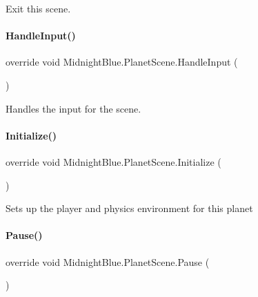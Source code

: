 Exit this scene. 

\hypertarget{class_midnight_blue_1_1_planet_scene_a6c84a639f27b9f7510b514969d47d1bd}{}\label{class_midnight_blue_1_1_planet_scene_a6c84a639f27b9f7510b514969d47d1bd} 
\paragraph{\texorpdfstring{Handle\+Input()}{HandleInput()}}
{\footnotesize\ttfamily override void Midnight\+Blue.\+Planet\+Scene.\+Handle\+Input (\begin{DoxyParamCaption}{ }\end{DoxyParamCaption})\hspace{0.3cm}{\ttfamily [inline]}}



Handles the input for the scene. 

\hypertarget{class_midnight_blue_1_1_planet_scene_ac8b7e88283b22b87aa45f116b549e86f}{}\label{class_midnight_blue_1_1_planet_scene_ac8b7e88283b22b87aa45f116b549e86f} 
\paragraph{\texorpdfstring{Initialize()}{Initialize()}}
{\footnotesize\ttfamily override void Midnight\+Blue.\+Planet\+Scene.\+Initialize (\begin{DoxyParamCaption}{ }\end{DoxyParamCaption})\hspace{0.3cm}{\ttfamily [inline]}}



Sets up the player and physics environment for this planet 

\hypertarget{class_midnight_blue_1_1_planet_scene_abc077e1cd5f40879ca3af4224f0ff455}{}\label{class_midnight_blue_1_1_planet_scene_abc077e1cd5f40879ca3af4224f0ff455} 
\paragraph{\texorpdfstring{Pause()}{Pause()}}
{\footnotesize\ttfamily override void Midnight\+Blue.\+Planet\+Scene.\+Pause (\begin{DoxyParamCaption}{ }\end{DoxyParamCaption})\hspace{0.3cm}{\ttfamily [inline]}}



